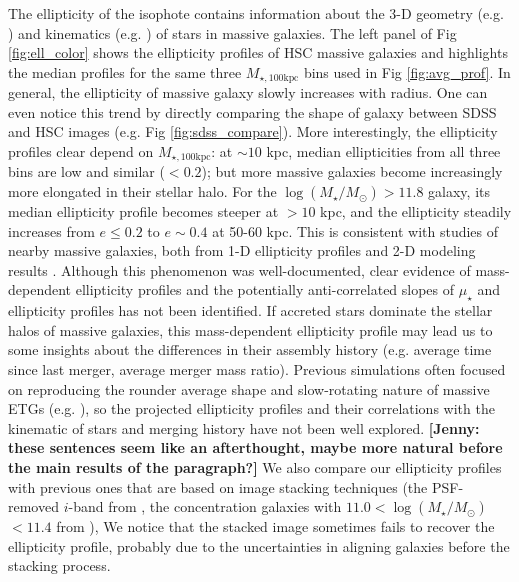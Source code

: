 \documentclass[a4paper,fleqn,usenatbib]{mnras}
\def\logms{{$\log (M_{\star}/M_{\odot})$}}
\def\mtot{{$M_{\star,100\mathrm{kpc}}$}}
\def\mden{{$\mu_{\star}$}}
\newcommand{\jenny}[1]{\textcolor{Bittersweet}{\textbf{[Jenny: #1]}}}
\begin{document}
	The ellipticity of the isophote contains information about the 3-D geometry 
	(e.g. \citealt{Chang2013, Mitsuda2017}) and kinematics (e.g. 
	\citealt{Cappellari2012, Weijmans2014}) of stars in massive galaxies.  
	The left panel of Fig \ref{fig:ell_color} shows the ellipticity profiles of HSC 
	massive galaxies and highlights the median profiles for the same three \mtot{} 
	bins used in Fig \ref{fig:avg_prof}. 
	In general, the ellipticity of massive galaxy slowly increases with radius.
	One can even notice this trend by directly comparing the shape of galaxy between 
	SDSS and HSC images (e.g. Fig \ref{fig:sdss_compare}).  
	More interestingly, the ellipticity profiles clear depend on \mtot{}: 
	at ${\sim} 10$ kpc, median ellipticities from all three bins are low and similar 
	($< 0.2$); but more massive galaxies become increasingly more elongated in their
	stellar halo. 	
	For the \logms{}$>11.8$ galaxy, its median ellipticity profile becomes steeper 
	at $>10$ kpc, and the ellipticity steadily increases from $e\le 0.2$ to 
	$e{\sim} 0.4$ at 50-60 kpc.
	This is consistent with studies of nearby massive galaxies, both from 1-D 
	ellipticity profiles and 2-D modeling results \citep{Gonzalez2005, 
	Huang2013a, Spavone2017}.
	Although this phenomenon was well-documented, clear evidence of mass-dependent
	ellipticity profiles and the potentially anti-correlated slopes of \mden{} and 
	ellipticity profiles has not been identified.
	If accreted stars dominate the stellar halos of massive galaxies, this 
	mass-dependent ellipticity profile may lead us to some insights about the 
	differences in their assembly history (e.g. average time since last merger, 
	average merger mass ratio).
	Previous simulations often focused on reproducing the rounder average shape 
	and slow-rotating nature of massive ETGs (e.g. \citealt{Wu2014}), so the projected 
	ellipticity profiles and their correlations with the kinematic of stars and 
	merging history have not been well explored. 
    \jenny{these sentences seem like an afterthought, maybe more natural before the main
    results of the paragraph?}
	We also compare our ellipticity profiles with previous ones that are based on 
	image stacking techniques (the PSF-removed $i$-band from \citealt{Tal2011}, 
	the concentration galaxies with $11.0<$\logms{}$<11.4$ from 
	\citealt{DSouza2015}), 
	We notice that the stacked image sometimes fails to recover the ellipticity 
	profile, probably due to the uncertainties in aligning galaxies before the 
	stacking process.
    
\end{document}
